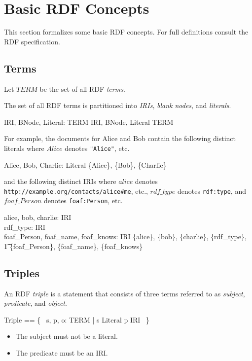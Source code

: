 \documentclass{article}
\begin{document}
\cbend

\section{Basic RDF Concepts}
\label{sec-basics}

This section formalizes some basic RDF concepts.
For full definitions consult the RDF specification\cite{w3c:rdf11}.

\subsection{Terms}

Let $TERM$ be the set of all RDF {\em terms}.
\begin{zed}
[TERM]
\end{zed}

The set of all RDF terms is partitioned into {\em IRIs}, {\em blank nodes}, and {\em literals}.
\begin{axdef}
IRI, BNode, Literal: \power TERM
\where
\langle IRI, BNode, Literal \rangle \partition TERM
\end{axdef}

For example, the documents for Alice and Bob contain the following distinct literals
where $Alice$ denotes {\tt "Alice"}, etc.
\begin{axdef}
	Alice, Bob, Charlie: Literal
\where
	\disjoint \langle \{Alice\}, \{Bob\}, \{Charlie\} \rangle
\end{axdef}
and the following distinct IRIs where $alice$ denotes {\tt http://example.org/contacts/alice\#me}, etc., 
$rdf\_type$ denotes {\tt rdf:type}, and
$foaf\_Person$ denotes {\tt foaf:Person}, etc.
\begin{axdef}
	alice, bob, charlie: IRI \\
	rdf\_type: IRI \\
	foaf\_Person, foaf\_name, foaf\_knows: IRI
\where
	\disjoint \langle \{alice\}, \{bob\}, \{charlie\}, \{rdf\_type\}, \\
\t1		\{foaf\_Person\}, \{foaf\_name\}, \{foaf\_knows\} \rangle
\end{axdef}

\subsection{Triples}

An RDF {\em triple} is a statement that consists of three terms referred to as {\em subject}, {\em predicate}, and {\em object}.
\begin{zed}
Triple == \{~ s, p, o: TERM | s \notin Literal \land p \in IRI ~\}
\end{zed}
\begin{itemize}
\item The subject must not be a literal.
\item The predicate must be an IRI.
\end{itemize}
\end{document}
